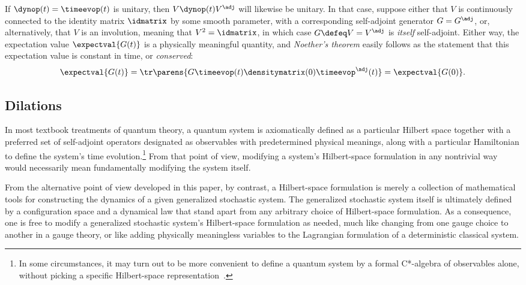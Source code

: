 \documentclass[12pt,english,prl,superscriptaddress,nobibnotes,nofootinbib]{revtex4-2}
\let\originalleft\left
\let\originalright\right
\renewcommand{\left}{\mathopen{}\mathclose\bgroup\originalleft}
\renewcommand{\right}{\aftergroup\egroup\originalright}
\begin{document}
If $\dynop\left(t\right)=\timeevop\left(t\right)$ is unitary, then
$V\dynop\left(t\right)V^{\adj}$ will likewise be unitary. In that
case, suppose either that $V$ is continuously connected to the identity
matrix $\idmatrix$ by some smooth parameter, with a corresponding
self-adjoint generator $G=G^{\adj}$, or, alternatively, that $V$
is an involution, meaning that $V^{2}=\idmatrix$, in which case $G\defeq V=V^{\adj}$
is \emph{itself} self-adjoint. Either way, the expectation value $\expectval{G\left(t\right)}$
is a physically meaningful quantity, and \emph{Noether's theorem}
easily follows as the statement that this expectation value is constant
in time, or \emph{conserved}: 
\begin{equation}
\expectval{G\left(t\right)}=\tr\parens{G\timeevop\left(t\right)\densitymatrix\left(0\right)\timeevop^{\adj}\left(t\right)}=\expectval{G\left(0\right)}.\label{eq:NoethersTheorem}
\end{equation}


\subsection{Dilations\label{subsec:Dilations}}

In most textbook treatments of quantum theory, a quantum system is
axiomatically defined as a particular Hilbert space together with
a preferred set of self-adjoint operators designated as observables
with predetermined physical meanings, along with a particular Hamiltonian
to define the system's time evolution.\footnote{In some circumstances, it may turn out to be more convenient to define
a quantum system by a formal C{*}-algebra of observables alone, without
picking a specific Hilbert-space representation~\citep{Haag:1993lqpfpa,Strocchi:2008aittmsoqm,Feintzeig:2016oamiqt}.} From that point of view, modifying a system's Hilbert-space formulation
in any nontrivial way would necessarily mean fundamentally modifying
the system itself.

From the alternative point of view developed in this paper, by contrast,
a Hilbert-space formulation is merely a collection of mathematical
tools for constructing the dynamics of a given generalized stochastic
system. The generalized stochastic system itself is ultimately defined
by a configuration space and a dynamical law that stand apart from
any arbitrary choice of Hilbert-space formulation. As a consequence,
one is free to modify a generalized stochastic system's Hilbert-space
formulation as needed, much like changing from one gauge choice to
another in a gauge theory, or like adding physically meaningless variables
to the Lagrangian formulation of a deterministic classical system.
\end{document}
